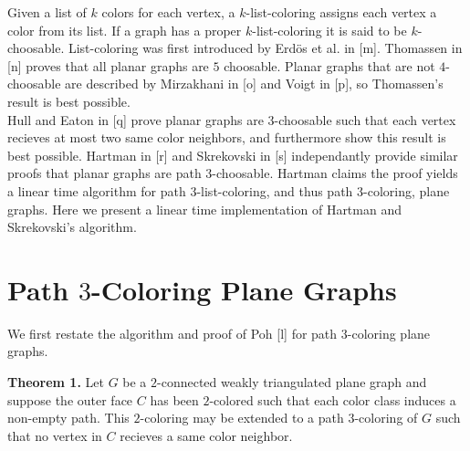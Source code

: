 \documentclass[11pt,letter]{article}
\begin{document}
\noindent Given a list of $k$ colors for each vertex, a $k$-list-coloring assigns each vertex a color from its list.
If a graph has a proper $k$-list-coloring it is said to be $k$-choosable. List-coloring was first introduced by
Erd{\"o}s et al. in [m]. Thomassen in [n] proves that all planar graphs are $5$ choosable. Planar
graphs that are not $4$-choosable are described by Mirzakhani in [o] and Voigt in [p], so Thomassen's result
is best possible.\\

\noindent Hull and Eaton in [q] prove planar graphs are $3$-choosable such that each vertex recieves at most two
same color neighbors, and furthermore show this result is best possible. Hartman in [r] and Skrekovski in [s] independantly
provide similar proofs that planar graphs are path $3$-choosable. Hartman claims the proof yields
a linear time algorithm for path $3$-list-coloring, and thus path $3$-coloring, plane graphs. Here we present a
linear time implementation of Hartman and Skrekovski's algorithm.\\

\section{Path $3$-Coloring Plane Graphs}

We first restate the algorithm and proof of Poh [l] for path $3$-coloring plane graphs.\\

\begin{adjustwidth}{1.5em}{1.5em}
\noindent\textbf{Theorem 1.} Let $G$ be a $2$-connected weakly triangulated plane graph and
suppose the outer face $C$ has been $2$-colored such that each color class induces a non-empty path. This
$2$-coloring may be extended to a path $3$-coloring of $G$ such that no vertex in $C$ recieves a same color
neighbor.
\end{adjustwidth}
\end{document}
